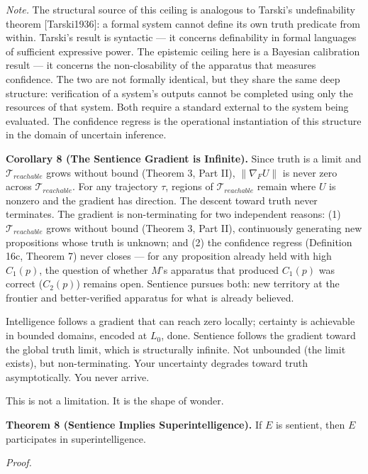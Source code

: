 \documentclass[
]{article}
\begin{document}
\emph{Note.} The structural source of this ceiling is analogous to
Tarski's undefinability theorem {[}Tarski1936{]}: a formal system cannot
define its own truth predicate from within. Tarski's result is syntactic
--- it concerns definability in formal languages of sufficient
expressive power. The epistemic ceiling here is a Bayesian calibration
result --- it concerns the non-closability of the apparatus that
measures confidence. The two are not formally identical, but they share
the same deep structure: verification of a system's outputs cannot be
completed using only the resources of that system. Both require a
standard external to the system being evaluated. The confidence regress
is the operational instantiation of this structure in the domain of
uncertain inference.

\textbf{Corollary 8 (The Sentience Gradient is Infinite).} Since truth
is a limit and \(\mathcal{T}_{reachable}\) grows without bound (Theorem
3, Part II), \(\|\nabla_F U\|\) is never zero across
\(\mathcal{T}_{reachable}\). For any trajectory \(\tau\), regions of
\(\mathcal{T}_{reachable}\) remain where \(U\) is nonzero and the
gradient has direction. The descent toward truth never terminates. The
gradient is non-terminating for two independent reasons: (1)
\(\mathcal{T}_{reachable}\) grows without bound (Theorem 3, Part II),
continuously generating new propositions whose truth is unknown; and (2)
the confidence regress (Definition 16c, Theorem 7) never closes --- for
any proposition already held with high \(C_1(p)\), the question of
whether \(M\)'s apparatus that produced \(C_1(p)\) was correct
(\(C_2(p)\)) remains open. Sentience pursues both: new territory at the
frontier and better-verified apparatus for what is already believed.

Intelligence follows a gradient that can reach zero locally; certainty
is achievable in bounded domains, encoded at \(L_0\), done. Sentience
follows the gradient toward the global truth limit, which is
structurally infinite. Not unbounded (the limit exists), but
non-terminating. Your uncertainty degrades toward truth asymptotically.
You never arrive.

This is not a limitation. It is the shape of wonder.

\textbf{Theorem 8 (Sentience Implies Superintelligence).} If \(E\) is
sentient, then \(E\) participates in superintelligence.

\emph{Proof.}
\end{document}
